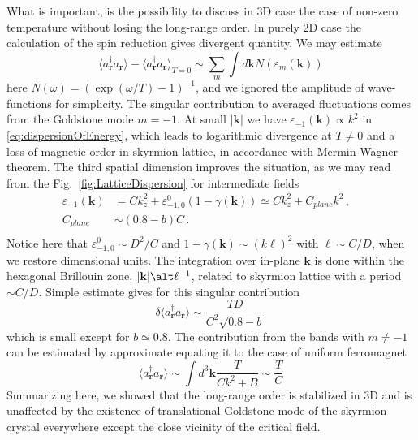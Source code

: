 \documentclass[aps,prb,twocolumn,superscriptaddress,nobalancelastpage]{revtex4-1}
\begin{document}
What is important, is the possibility to discuss  in 3D case the case of non-zero temperature without losing the long-range order. In purely 2D case the calculation of the spin reduction gives divergent quantity. We may estimate  
$$\langle a^{\dagger} _{\mathbf{r} } a _{\mathbf{r} }\rangle - 
\langle a^{\dagger} _{\mathbf{r} } a _{\mathbf{r} }\rangle _{T=0} \sim  \sum _{m}  
   \int d\mathbf{k}  N(\varepsilon_{m} (\mathbf{k}))$$ 
 here  $N(\omega) = (\exp(\omega/T)-1)^{-1}$, and we ignored the amplitude of wave-functions for simplicity. The singular contribution to averaged fluctuations comes from the Goldstone mode $m=-1$. 
At small $|\mathbf{k} |$ we have  $\varepsilon_{-1} (\mathbf{k}) \propto  k^{2} $ in  \eqref{eq:dispersionOfEnergy}, which leads to logarithmic divergence at $T\neq 0$ and a loss of magnetic order in skyrmion lattice, in accordance with Mermin-Wagner theorem.  The third spatial dimension   improves the situation, as we may read from the Fig.\  \ref{fig:LatticeDispersion}   for intermediate fields 
 \begin{equation}
\begin{aligned}
 \varepsilon_{-1} (\mathbf{k})  & = C k_{z}^{2} +  \varepsilon_{-1,0}^0 (1-  \gamma(\mathbf{k}))
\simeq     C    k_{z}^{2}  + C_{plane} k^{2}   \,,
 &    \\
C_{plane} &  \sim    (0.8 - b) C  \,. \\
\end{aligned}
\label{spectrum3D.low}
\end{equation}
Notice here that $ \varepsilon_{-1,0}^0 \sim D^{2}/C$ and  $1-  \gamma(\mathbf{k}) \sim (k\ell)^{2}$ with $\ell \sim C/D$, when we restore dimensional units. 
The integration over in-plane $\mathbf{k}$ is done within the hexagonal Brillouin zone, $|\mathbf{k}|\alt \ell^{-1}$, related to skyrmion lattice with a period $\sim C/D$.  Simple estimate gives for this singular contribution 
\[ \delta \langle a^{\dagger} _{\mathbf{r} } a _{\mathbf{r} }\rangle \sim \frac{T D}{C^{2}\sqrt{0.8-b}} \, \]
which is small except for $b\simeq 0.8$. 
The contribution from the bands with $m\neq-1$ can be estimated by approximate equating it to the case of uniform ferromagnet  
 \[  \langle a^{\dagger} _{\mathbf{r} } a _{\mathbf{r} }\rangle \sim  \int d^{3}\mathbf{k}  \frac{T}{C k^{2} + B} \sim \frac TC\]
Summarizing here, we showed that the long-range order is stabilized in 3D and is unaffected by the existence of translational Goldstone mode of the skyrmion crystal everywhere except the close vicinity of the critical field.  
  
\end{document}
